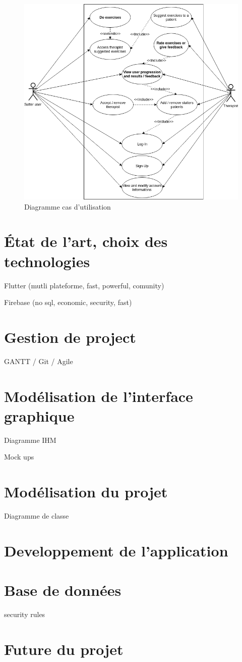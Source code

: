 \begin{figure}[h]
  \includegraphics[width=.9\linewidth]{content/imgs/usecase.png}
  \caption{Diagramme cas d'utilisation}
  \label{fig:srs}
\end{figure}


\section{État de l'art, choix des technologies}

Flutter (mutli plateforme, fast, powerful, comunity)

Firebase (no sql, economic, security, fast)




\section{Gestion de project}
GANTT / Git / Agile

\section{Modélisation de l'interface graphique}
Diagramme IHM

Mock ups

\section{Modélisation du projet}
Diagramme de classe

\section{Developpement de l'application}


\section{Base de données}
security rules




\section{Future du projet}
